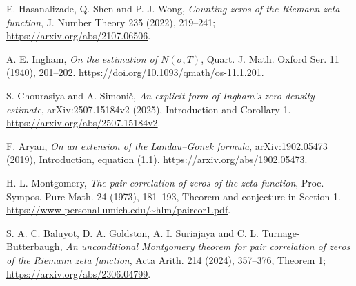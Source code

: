 E. Hasanalizade, Q. Shen and P.-J. Wong,
\emph{Counting zeros of the Riemann zeta function},
J. Number Theory 235 (2022), 219--241;
\url{https://arxiv.org/abs/2107.06506}.

A. E. Ingham, \emph{On the estimation of $N(\sigma,T)$},
Quart. J. Math. Oxford Ser. 11 (1940), 201--202.
\url{https://doi.org/10.1093/qmath/os-11.1.201}.

S. Chourasiya and A. Simoni\v{c},
\emph{An explicit form of Ingham's zero density estimate},
arXiv:2507.15184v2 (2025), Introduction and Corollary 1.
\url{https://arxiv.org/abs/2507.15184v2}.

F. Aryan, \emph{On an extension of the Landau--Gonek formula},
arXiv:1902.05473 (2019), Introduction, equation (1.1).
\url{https://arxiv.org/abs/1902.05473}.

H. L. Montgomery, \emph{The pair correlation of zeros of the zeta
function}, Proc. Sympos. Pure Math. 24 (1973), 181--193,
Theorem and conjecture in Section 1.
\url{https://www-personal.umich.edu/~hlm/paircor1.pdf}.

S. A. C. Baluyot, D. A. Goldston, A. I. Suriajaya and
C. L. Turnage-Butterbaugh,
\emph{An unconditional Montgomery theorem for pair correlation of
zeros of the Riemann zeta function}, Acta Arith. 214 (2024), 357--376,
Theorem 1; \url{https://arxiv.org/abs/2306.04799}.


